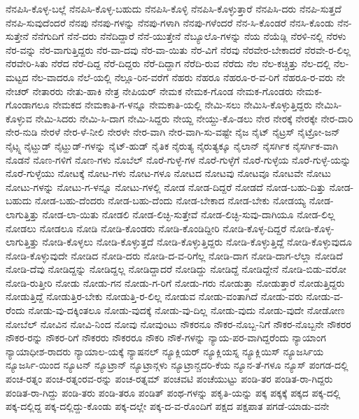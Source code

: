 {ನೆನಪಿಸಿ-ಕೊಳ್ಳ-ಬಲ್ಲೆ
ನೆನಪಿಸಿ-ಕೊಳ್ಳ-ಬಹುದು
ನೆನಪಿಸಿ-ಕೊಳ್ಳಿ
ನೆನಪಿಸಿ-ಕೊಳ್ಳುತ್ತಾರೆ
ನೆನಪಿಸಿ-ದರು
ನೆನಪಿ-ಸುತ್ತದೆ
ನೆನಪಿ-ಸುವುದೆಂದರೆ
ನೆನಪು
ನೆನಪು-ಗಳನ್ನು
ನೆನಪು-ಗಳಾಗಿ
ನೆನಪು-ಗಳೆಂದರೆ
ನೆನ-ಸಿ-ಕೊಂಡರೆ
ನೆನಸಿ-ಕೊಂಡು
ನೆನ-ಸುತ್ತೇನೆ
ನೆನೆಗುದಿಗೆ
ನೆನೆ-ದರು
ನೆನೆದಿದ್ದಾರೆ
ನೆನೆ-ಯುತ್ತೇನೆ
ನೆಬ್ಯೂಲೊ-ಗಳನ್ನು
ನೆಯ
ನೆಯೆಡ್ಲಿ
ನೆರಳಿ-ನಲ್ಲಿ
ನೆರಳು
ನೆರ-ವನ್ನು
ನೆರ-ವಾಗುತ್ತಿದ್ದರು
ನೆರ-ವಾ-ದವು
ನೆರ-ವಾ-ಯಿತು
ನೆರ-ವಿಗೆ
ನೆರವು
ನೆರವೇರ-ಬೇಕಾದರೆ
ನೆರವೇ-ರ-ಲಿಲ್ಲ
ನೆರವೇರಿ-ಸಿತು
ನೆರೆದ
ನೆರೆ-ದಿದ್ದ
ನೆರೆ-ದಿದ್ದರು
ನೆರೆ-ದಿದ್ದಾಗ
ನೆರೆದಿ-ರುವ
ನೆರೆದು
ನೆಲ
ನೆಲ-ಕಚ್ಚಿತ್ತು
ನೆಲ-ದಲ್ಲಿ
ನೆಲ-ಮಟ್ಟದ
ನೆಲ-ವಾದರೂ
ನೆಲೆ-ಯಲ್ಲಿ
ನೆಲ್ಲೂ-ರಿನ-ವರೆಗೆ
ನೆಹರು
ನೆಹರೂ
ನೆಹರೂ-ರ-ವ-ರಿಗೆ
ನೆಹರೂ-ರ-ವರು
ನೇ
ನೇಚರ್
ನೇತಾರರು
ನೇತು-ಹಾಕಿ
ನೇತ್ರ
ನೇಪಿಯರ್
ನೇಮಕ
ನೇಮಕ-ಗೊಂಡ
ನೇಮಕ-ಗೊಂಡರು
ನೇಮಕ-ಗೊಂಡಾಗಲೂ
ನೇಮಕದ
ನೇಮಕಾತಿ-ಗ-ಳನ್ನೂ
ನೇಮಕಾತಿ-ಯಲ್ಲಿ
ನೇಮಿ-ಸಲು
ನೇಮಿಸಿ-ಕೊಳ್ಳುತ್ತಿದ್ದರು
ನೇಮಿಸಿ-ಕೊಳ್ಳುವ
ನೇಮಿ-ಸಿದರು
ನೇಮಿ-ಸಿ-ದಾಗ
ನೇಮಿ-ಸಿದ್ದರು
ನೇಯ್ದ
ನೇಯ್ದು-ಕೊ-ಡಲು
ನೇರ
ನೇರಕ್ಕೆ
ನೇರಕ್ಕೇ
ನೇರ-ದಾರಿ
ನೇರ-ನುಡಿ
ನೇರಳೆ
ನೇರ-ಳೆ-ನೀಲಿ
ನೇರಳೇ
ನೇರ-ವಾಗಿ
ನೇರ-ವಾಗಿ-ಸು-ವಷ್ಟೇ
ನೈಜ
ನೈಟ್
ನೈಟ್ರಸ್
ನೈಟ್ರೋ-ಜನ್
ನೈಟ್ಸ್ನ
ನೈಟ್ಹುಡ್
ನೈಟ್ಹುಡ್-ಗಳನ್ನು
ನೈಟ್-ಹುಡ್
ನೈತಿಕ
ನೈರುತ್ಯ
ನೈರುತ್ಯಕ್ಕೂ
ನೈಲಾನ್
ನೈಸರ್ಗಿಕ
ನೈಸರ್ಗಿಕ-ವಾಗಿ
ನೊಡನೆ
ನೊಣ-ಗಳಿಗೆ
ನೊಣ-ಗಳು
ನೊಬೆಲ್
ನೊರೆ-ಗುಳ್ಳೆ-ಗಳ
ನೊರೆ-ಗುಳ್ಳೆಗೆ
ನೊರೆ-ಗುಳ್ಳೆಯ
ನೊರೆ-ಗುಳ್ಳೆ-ಯನ್ನು
ನೊರೆ-ಗುಳ್ಳೆಯು
ನೋಟಕ್ಕೆ
ನೋಟ-ಗಳು
ನೋಟ-ಗಳೂ
ನೋಟದ
ನೋಟವು
ನೋಟವೂ
ನೋಟವೇ
ನೋಟು
ನೋಟು-ಗಳನ್ನು
ನೋಟು-ಗ-ಳನ್ನೂ
ನೋಟು-ಗಳಲ್ಲಿ
ನೋಡ
ನೋಡ-ದಿದ್ದರೆ
ನೋಡದೆ
ನೋಡ-ಬಹು-ದಿತ್ತು
ನೋಡ-ಬಹುದು
ನೋಡ-ಬಹು-ದೆಂದರು
ನೋಡ-ಬಹು-ದೆಂದು
ನೋಡ-ಬೇಕಾದ
ನೋಡ-ಬೇಕು
ನೋಡಯ್ಯ
ನೋಡ-ಲಾಗುತ್ತಿತ್ತು
ನೋಡ-ಲಾ-ಯಿತು
ನೋಡಲಿ
ನೋಡ-ಲಿಚ್ಛಿ-ಸುತ್ತೇವೆ
ನೋಡ-ಲಿಚ್ಛಿ-ಸುವು-ದಾಗಿಯೂ
ನೋಡ-ಲಿಲ್ಲ
ನೋಡಲು
ನೋಡಲೂ
ನೋಡಿ
ನೋಡಿ-ಕೊಂಡರು
ನೋಡಿ-ಕೊಂಡಿದ್ದೀರಿ
ನೋಡಿ-ಕೊಳ್ಳ-ದಿದ್ದರೆ
ನೋಡಿ-ಕೊಳ್ಳ-ಲಾಗುತ್ತಿತ್ತು
ನೋಡಿ-ಕೊಳ್ಳಲು
ನೋಡಿ-ಕೊಳ್ಳುತ್ತದೆ
ನೋಡಿ-ಕೊಳ್ಳುತ್ತಿದ್ದರು
ನೋಡಿ-ಕೊಳ್ಳುತ್ತಿದ್ದೆ
ನೋಡಿ-ಕೊಳ್ಳುವುದೂ
ನೋಡಿ-ಕೊಳ್ಳುವುದೇ
ನೋಡಿದ
ನೋಡಿ-ದರು
ನೋಡಿ-ದ-ವ-ರಿಗೆಲ್ಲ
ನೋಡಿ-ದಾಗ
ನೋಡಿ-ದಾಗ-ಲೆಲ್ಲಾ
ನೋಡಿದೆ
ನೋಡಿ-ದೆವು
ನೋಡಿದ್ದನ್ನು
ನೋಡಿದ್ದಲ್ಲ
ನೋಡಿದ್ದಾದರೆ
ನೋಡಿದ್ದು
ನೋಡಿದ್ದೆ
ನೋಡಿದ್ದೇನೆ
ನೋಡಿ-ಬಿಡು-ವರೋ
ನೋಡಿ-ರುತ್ತೀರಿ
ನೋಡು
ನೋಡು-ಗನ
ನೋಡು-ಗ-ರಿಗೆ
ನೋಡು-ಗರು
ನೋಡುತ್ತಾ
ನೋಡುತ್ತಾರೆ
ನೋಡುತ್ತಿದ್ದರು
ನೋಡುತ್ತಿದ್ದೆ
ನೋಡುತ್ತಿರ-ಬೇಕು
ನೋಡುತ್ತಿ-ರ-ಲಿಲ್ಲ
ನೋಡುವ
ನೋಡು-ವಂತಾಗಿದೆ
ನೋಡು-ವರು
ನೋಡು-ವ-ರೆಂದು
ನೋಡು-ವು-ದಕ್ಕಿಂತಲೂ
ನೋಡು-ವುದಕ್ಕೆ
ನೋಡು-ವು-ದಿಲ್ಲ
ನೋಡು-ವುದು
ನೋಡು-ವುದೇ
ನೋಡೋಣ
ನೋಬೆಲ್
ನೋವಿನ
ನೋವಿ-ನಿಂದ
ನೋವು
ನೋವುಂಟು
ನೌಕರನೂ
ನೌಕರ-ನೊಬ್ಬ-ನಿಗೆ
ನೌಕರ-ನೊಬ್ಬನೇ
ನೌಕರರ
ನೌಕರ-ರನ್ನು
ನೌಕರ-ರಿಗೆ
ನೌಕರರು
ನೌಕರರೂ
ನೌಕರಿ
ನೌಕೆ-ಗಳನ್ನು
ನ್ಯಾಯ-ಪರ-ವಾಗಿದ್ದರೆಂದು
ನ್ಯಾಯಾಂಗ
ನ್ಯಾಯಾಧೀಶ-ರಾದರು
ನ್ಯಾಯಾಲ-ಯಕ್ಕೆ
ನ್ಯಾಷನಲ್
ನ್ಯೂಕ್ಲಿಯರ್
ನ್ಯೂಕ್ಲಿಯಸ್ನ
ನ್ಯೂಕ್ಲಿಯಿಸ್
ನ್ಯೂಜರ್ಸಿಯ
ನ್ಯೂಜರ್ಸಿ-ಯಿಂದ
ನ್ಯೂಟನ್
ನ್ಯೂಟ್ರಾನ್
ನ್ಯೂಟ್ರಾನ್ಗಳು
ನ್ಯೂಟ್ರಾನ್ಚದರಿ-ಕೆಯ
ನ್ಯೂನ-ತೆ-ಗಳೂ
ನ್ಯೂಸ್
ಪಂಗಡ-ದಲ್ಲಿ
ಪಂಚ-ರತ್ನಂ
ಪಂಚ-ರತ್ನಂರವ-ರನ್ನು
ಪಂಚ-ರತ್ನಮ್
ಪಂಚವಟಿ
ಪಂಚೆಯುಟ್ಟು
ಪಂಡಿ-ತರ
ಪಂಡಿತ-ರಾ-ಗಿದ್ದರು
ಪಂಡಿತ-ರಾ-ಗಿದ್ದು
ಪಂಡಿ-ತರು
ಪಂಡಿ-ತರೂ
ಪಂಡಿತ್
ಪಂಥ-ಗಳನ್ನು
ಪಕೃತಿ-ಯನ್ನು
ಪಕ್ಕ
ಪಕ್ಕಕ್ಕೆ
ಪಕ್ಕದ
ಪಕ್ಕ-ದಲ್ಲಿ
ಪಕ್ಕ-ದಲ್ಲಿದ್ದ
ಪಕ್ಕ-ದಲ್ಲಿದ್ದು-ಕೊಂಡು
ಪಕ್ಕ-ದಲ್ಲೇ
ಪಕ್ಕ-ದ-ವ-ರೊಂದಿಗೆ
ಪಕ್ಷದ
ಪಕ್ಷಪಾತ
ಪಗಡೆ-ಯಾಡು-ವನೇ
}
